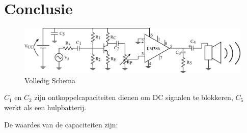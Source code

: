 \documentclass{article}
\begin{document}
	\section{Conclusie}

		\begin{figure}[htbp]
			\includegraphics[width=\linewidth]{volledig_schema}
			\caption{Volledig Schema}
			\label{fig:volledig_schema}
		\end{figure}
		$C_1$ en $C_2$ zijn ontkoppelcapaciteiten dienen om DC signalen te blokkeren, $C_5$ werkt als een hulpbatterij.
		\begin{center}
			\noindent {}
		\end{center}

		De waardes van de capaciteiten zijn:
		\begin{center}
			 			\noindent {}
		\end{center}
\end{document}

